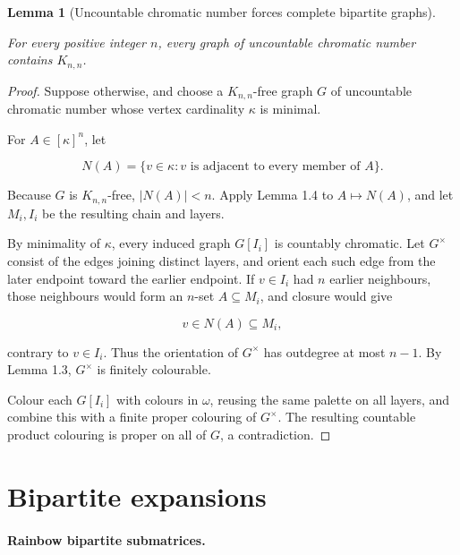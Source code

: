 \documentclass[a4paper,11pt,reqno]{amsart}
\theoremstyle{plain}
\newtheorem{lemma}[theorem]{Lemma}
\theoremstyle{definition}
\theoremstyle{remark}
\begin{document}
\begin{lemma}[Uncountable chromatic number forces complete bipartite graphs]\label{lemma-2.1-uncountable-chromatic-number-forces-complete-bipartite-graphs}

For every positive integer \(n\), every graph of uncountable chromatic number contains \(K_{n,n}\).

\end{lemma}
\begin{proof}
Suppose otherwise, and choose a \(K_{n,n}\)-free graph \(G\) of uncountable chromatic number whose vertex cardinality \(\kappa\) is minimal.

For \(A\in[\kappa]^n\), let

\[
N(A)=\{v\in\kappa:v\text{ is adjacent to every member of }A\}.
\]

Because \(G\) is \(K_{n,n}\)-free, \(|N(A)|<n\). Apply Lemma 1.4 to \(A\mapsto N(A)\), and let \(M_i,I_i\) be the resulting chain and layers.

By minimality of \(\kappa\), every induced graph \(G[I_i]\) is countably chromatic. Let \(G^\times\) consist of the edges joining distinct layers, and orient each such edge from the later endpoint toward the earlier endpoint. If \(v\in I_i\) had \(n\) earlier neighbours, those neighbours would form an \(n\)-set \(A\subseteq M_i\), and closure would give

\[
v\in N(A)\subseteq M_i,
\]

contrary to \(v\in I_i\). Thus the orientation of \(G^\times\) has outdegree at most \(n-1\). By Lemma 1.3, \(G^\times\) is finitely colourable.

Colour each \(G[I_i]\) with colours in \(\omega\), reusing the same palette on all layers, and combine this with a finite proper colouring of \(G^\times\). The resulting countable product colouring is proper on all of \(G\), a contradiction.
\end{proof}

\section{Bipartite expansions}\label{private-vertex-expansions-of-bipartite-graphs-are-obligatory}

\paragraph{Rainbow bipartite submatrices.}\label{rainbow-bipartite-submatrices}
\end{document}
